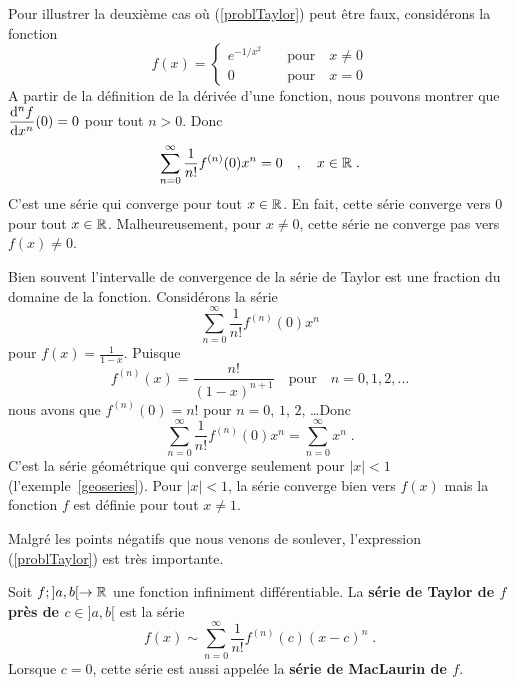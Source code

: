 {\begin{egg}
Pour illustrer la deuxième cas où (\ref{problTaylor}) peut être faux,
considérons la fonction
\[
f(x) = \begin{cases}
e^{-1/x^2} & \quad \text{pour} \quad x\neq 0 \\
0 & \quad \text{pour}\quad x = 0
\end{cases}
\]
A partir de la définition de la dérivée d'une fonction, nous pouvons montrer que
$\displaystyle \frac{\mathrm{d}^{n}f}{\mathrm{d}x^{n}}(0) = 0$ pour tout $n>0$.
Donc
\[
\sum_{n=0}^\infty \frac{1}{n!} f^{(n)}(0)x^n = 0 \quad , \quad
x \in \mathbb{R} \; .
\]
C'est une série qui converge pour tout $x\in \mathbb{R}$.  En fait, cette série
converge vers $0$ pour tout $x\in \mathbb{R}$.  Malheureusement, pour
$x \neq 0$, cette série ne converge pas vers $f(x) \neq 0$.
\end{egg}



\begin{egg}
Bien souvent l'intervalle de convergence de la série de Taylor est une
fraction du domaine de la fonction.  Considérons la série
\[
\sum_{n=0}^\infty \frac{1}{n!} f^{(n)}(0)x^n
\]
pour $\displaystyle f(x) = \frac{1}{1-x}$.  Puisque
\[
f^{(n)}(x) = \frac{n!}{(1-x)^{n+1}} \quad \text{pour} \quad n=0, 1, 2,
\ldots
\]
nous avons que $\displaystyle f^{(n)}(0) = n!$ pour $n=0$, $1$, $2$,
\ldots\quad  Donc
\[
\sum_{n=0}^\infty \frac{1}{n!} f^{(n)}(0)x^n = \sum_{n=0}^\infty x^n
\; .
\]
C'est la série géométrique qui converge seulement pour $|x| <1$
(l'exemple~\ref{geoseries}).  Pour $|x|< 1$, la série converge bien
vers $f(x)$ mais la fonction $f$ est définie pour tout $x\neq 1$.
\label{eggtaylorgeom}
\end{egg}

Malgré les points négatifs que nous venons de soulever, l'expression
(\ref{problTaylor}) est très importante.

\begin{defn} 
Soit $f;]a,b[\rightarrow \mathbb{R}$ une fonction infiniment différentiable.  La
{\bfseries série de Taylor de $f$ près de $c \in ]a,b[$} est la série
\begin{equation}\label{TaylorSeries}
f(x) \sim \sum_{n=0}^\infty \frac{1}{n!} f^{(n)}(c)(x-c)^n \; .
\end{equation}
Lorsque $c=0$, cette série est aussi appelée la
{\bfseries série de MacLaurin de $f$}.


\end{defn}}
